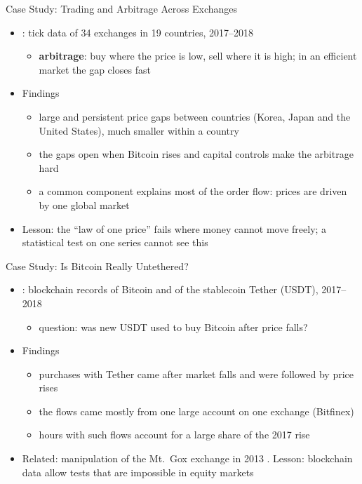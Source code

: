 \begin{frame}{Case Study: Trading and Arbitrage Across Exchanges}
\itemsize{\small}
\begin{itemize}
    \item {}: tick data of 34 exchanges in 19 countries, 2017--2018
    \begin{itemize}
        \item \textbf{arbitrage}: buy where the price is low, sell where it is high; in an efficient market the gap closes fast
    \end{itemize}
    \item Findings
    \begin{itemize}
        \item large and persistent price gaps between countries (Korea, Japan and the United States), much smaller within a country
        \item the gaps open when Bitcoin rises and capital controls make the arbitrage hard
        \item a common component explains most of the order flow: prices are driven by one global market
    \end{itemize}
    \item Lesson: the ``law of one price'' fails where money cannot move freely; a statistical test on one series cannot see this
\end{itemize}
\end{frame}

\begin{frame}{Case Study: Is Bitcoin Really Untethered?}
\itemsize{\small}
\begin{itemize}
    \item {}: blockchain records of Bitcoin and of the stablecoin Tether (USDT), 2017--2018
    \begin{itemize}
        \item question: was new USDT used to buy Bitcoin after price falls?
    \end{itemize}
    \item Findings
    \begin{itemize}
        \item purchases with Tether came after market falls and were followed by price rises
        \item the flows came mostly from one large account on one exchange (Bitfinex)
        \item hours with such flows account for a large share of the 2017 rise
    \end{itemize}
    \item Related: manipulation of the Mt.~Gox exchange in 2013 . Lesson: blockchain data allow tests that are impossible in equity markets
\end{itemize}
\end{frame}


